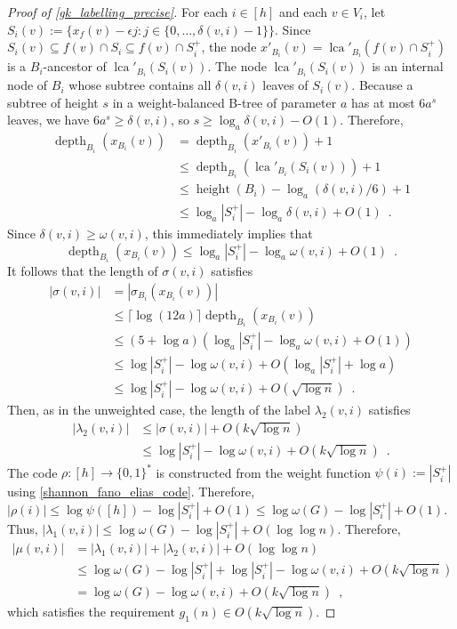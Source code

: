 \documentclass{patmorin}
\renewcommand{\ge}{\geqslant}
\renewcommand{\le}{\leqslant}
\DeclareMathOperator{\height}{height}
\DeclareMathOperator{\depth}{depth}
\DeclareMathOperator{\lca}{lca}
\newcommand{\Oh}{O}
\begin{document}
\begin{proof}[Proof of \cref{gk_labelling_precise}]
  For each $i\in[h]$ and each $v\in V_i$, let $S_i(v) := \{ x_f(v)-\epsilon j: j\in\{0,\ldots,\delta(v,i)-1\}\}$. Since $S_i(v) \subseteq f(v)\cap S_i \subseteq f(v)\cap S^+_i$, the node $x'_{B_i}(v) = \lca'_{B_i}(f(v)\cap S^+_i)$ is a $B_i$-ancestor of $\lca'_{B_i}(S_i(v))$. The node $\lca'_{B_i}(S_i(v))$ is an internal node of $B_i$ whose subtree contains all $\delta(v,i)$ leaves of $S_i(v)$. Because a subtree of height $s$ in a weight-balanced B-tree of parameter $a$ has at most $6a^s$ leaves, we have $6a^s \ge \delta(v,i)$, so $s \ge \log_a \delta(v,i) - O(1)$. Therefore,
  \begin{align*}
    \depth_{B_i}(x_{B_i}(v))
      & = \depth_{B_i}(x'_{B_i}(v)) + 1 \\
      & \le \depth_{B_i}(\lca'_{B_i}(S_i(v))) + 1 \\
      & \le \height(B_i) - \log_a(\delta(v,i)/6) + 1 \\
      & \le \log_a|S^+_i| - \log_a\delta(v,i) + \Oh(1) \enspace .
  \end{align*}
  Since $\delta(v,i) \ge \omega(v,i)$, this immediately implies that 
  \[
      \depth_{B_i}(x_{B_i}(v)) \le  \log_a|S^+_i| - \log_a\omega(v,i) + \Oh(1) \enspace .
  \]
  It follows that the length of $\sigma(v,i)$ satisfies
  \begin{align*}
    |\sigma(v,i)| 
      & = |\sigma_{B_i}(x_{B_i}(v))| \\
      & \le \lceil\log(12a)\rceil \depth_{B_i}(x_{B_i}(v)) \\
      & \le (5+\log a) (\log_a|S^+_i| - \log_a\omega(v,i) + \Oh(1)) \\
      & \le \log|S^+_i| - \log\omega(v,i) + \Oh(\log_a |S^+_i| + \log a) \\
      & \le \log|S^+_i| - \log\omega(v,i) + \Oh(\sqrt{\log n}) \enspace .
  \end{align*}
  Then, as in the unweighted case, the length of the label $\lambda_2(v,i)$ satisfies
  \begin{align*}
    |\lambda_2(v,i)|
      & \le |\sigma(v,i)| + \Oh(k\sqrt{\log n}) \\
      & \le \log |S^+_i|-\log \omega(v,i) + \Oh(k\sqrt{\log n}) \enspace .
  \end{align*}
  The code $\rho:[h]\to\{0,1\}^*$ is constructed from the weight function $\psi(i):=|S_i^+|$ using \cref{shannon_fano_elias_code}.  Therefore, 
  $|\rho(i)| \le \log\psi([h]) - \log|S^+_i| + \Oh(1) \le \log\omega(G) - \log|S^+_i| + \Oh(1)$.  Thus, 
  $|\lambda_1(v,i)|\le \log\omega(G) - \log |S^+_i| + \Oh(\log\log n)$.  Therefore,
  \begin{align*}
    |\mu(v,i)|
      & = |\lambda_1(v,i)|+|\lambda_2(v,i)| + \Oh(\log\log n) \\
      & \le \log\omega(G) - \log |S^+_i| + \log |S^+_i|-\log \omega(v,i) + \Oh(k\sqrt{\log n}) \\
      & = \log\omega(G) - \log\omega(v,i) + \Oh(k\sqrt{\log n}) \enspace ,
  \end{align*}
  which satisfies the requirement $g_1(n)\in O(k\sqrt{\log n})$.


\end{proof}
\end{document}

